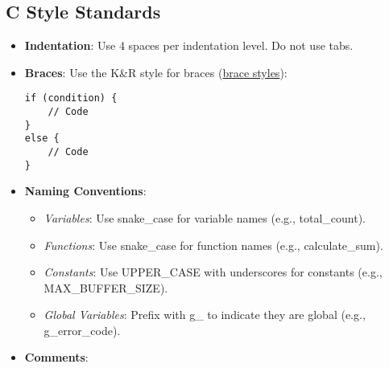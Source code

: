 \documentclass{ol-softwaremanual}
\begin{document}
\subsection{C Style Standards}
\begin{itemize}
    \item \textbf{Indentation}: Use 4 spaces per indentation level. Do not use tabs.

    \item \textbf{Braces}: Use the K\&R style for braces (\href{https://en.wikipedia.org/wiki/Indentation_style}{brace styles}):
\begin{example}
\begin{verbatim}
if (condition) {
    // Code
}
else {
    // Code
}
\end{verbatim}
\end{example}
\item \textbf{Naming Conventions}:
\begin{itemize}
    \item \textit{Variables}: Use snake\_case for variable names (e.g., total\_count).
    \item \textit{Functions}: Use snake\_case for function names (e.g., calculate\_sum).
    \item \textit{Constants}: Use UPPER\_CASE with underscores for constants (e.g., MAX\_BUFFER\_SIZE).
    \item \textit{Global Variables}: Prefix with g\_ to indicate they are global (e.g., g\_error\_code).
\end{itemize}
\item \textbf{Comments}:


\end{itemize}
\end{document}
